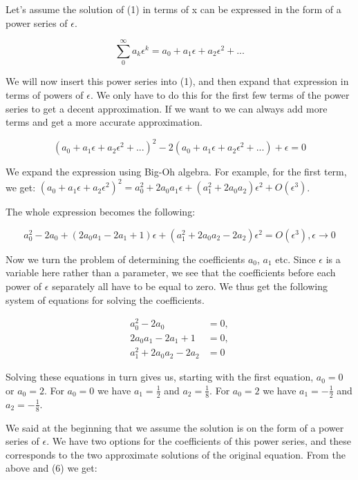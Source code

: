 \documentclass[12pt]{article}
\begin{document}
Let's assume the solution of (1) in terms of x can be expressed in the
form of a power series of $\epsilon$.

\begin{equation}
\sum_0^{\infty} a_k \epsilon^k = a_0 + a_1 \epsilon + a_2 \epsilon^2 + ...
\end{equation}

We will now insert this power series into (1), and then expand that expression
in terms of powers of $\epsilon$. We only have to do this for the first few
terms of the power series to get a decent approximation. If we want to we can
always add more terms and get a more accurate approximation.

\begin{equation}
(a_0 + a_1 \epsilon + a_2 \epsilon^2 + ...)^2 - 2(a_0 + a_1 \epsilon + a_2
\epsilon^2 + ...) + \epsilon = 0
\end{equation}

We expand the expression using Big-Oh algebra. For example, for the
first term, we get: $(a_0 + a_1 \epsilon + a_2 \epsilon^2)^2 = a_0^2 +
2 a_0 a_1 \epsilon + (a_1^2 + 2 a_0 a_2) \epsilon^2 + O(\epsilon^3)$.

The whole expression becomes the following:

\begin{equation}
a_0^2 - 2 a_0 + (2 a_0 a_1 - 2 a_1 + 1)\epsilon + (a_1^2 + 2 a_0 a_2 - 2 a_2)
\epsilon^2 = O(\epsilon^3), \epsilon \to 0
\end{equation}

Now we turn the problem of determining the coefficients $a_0$, $a_1$ etc. Since
$\epsilon$ is a variable here rather than a parameter, we see that the
coefficients before each power of $\epsilon$ separately all have to be equal to
zero. We thus get the following system of equations for solving the coefficients.

\begin{align}
a_0^2 - 2 a_0 &=0, \\
2 a_0 a_1 - 2 a_1 + 1 &= 0, \\
a_1^2 + 2 a_0 a_2 - 2 a_2 &= 0
\end{align}

Solving these equations in turn gives us, starting with the first
equation, $a_0 = 0$ or $a_0 = 2$. For $a_0 = 0$ we have $a_1 =
\frac{1}{2}$ and $a_2 = \frac{1}{8}$. For $a_0 = 2$ we have $a_1 = -
\frac{1}{2}$ and $a_2 = - \frac{1}{8}$.

We said at the beginning that we assume the solution is on the form of
a power series of $\epsilon$. We have two options for the coefficients
of this power series, and these corresponds to the two approximate
solutions of the original equation. From the above and (6) we get:
\end{document}
